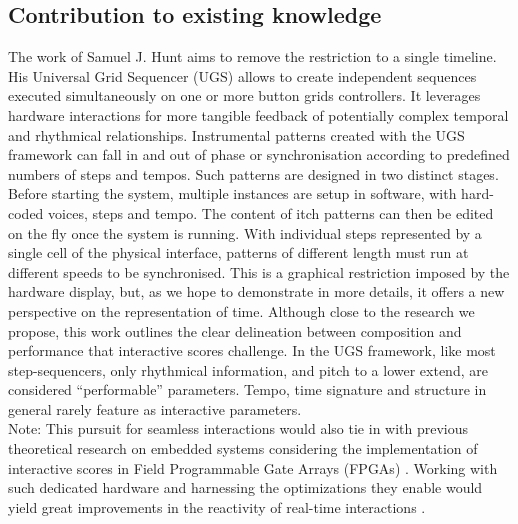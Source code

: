 \documentclass[journal,onecolumn]{IEEEtran}
\begin{document}
\subsection{Contribution to existing knowledge}
The work of Samuel J. Hunt \cite{hunt:poly} aims to remove the restriction to a single timeline. His Universal Grid Sequencer (UGS) allows to create independent sequences executed simultaneously on one or more button grids controllers. It leverages hardware interactions for more tangible feedback of potentially complex temporal and rhythmical relationships. Instrumental patterns created with the UGS framework can fall in and out of phase or synchronisation according to predefined numbers of steps and tempos. Such patterns are designed in two distinct stages. Before starting the system, multiple instances are setup in software, with hard-coded voices, steps and tempo. The content of itch patterns can then be edited on the fly once the system is running. With individual steps represented by a single cell of the physical interface, patterns of different length must run at different speeds to be synchronised. This is a graphical restriction imposed by the hardware display, but, as we hope to demonstrate in more details, it offers a new perspective on the representation of time. Although close to the research we propose, this work outlines the clear delineation between composition and performance that interactive scores challenge. In the UGS framework, like most step-sequencers, only rhythmical information, and pitch to a lower extend, are considered ``performable'' parameters. Tempo, time signature and structure in general rarely feature as interactive parameters. 
\\

Note: This pursuit for seamless interactions would also tie in with previous theoretical research on embedded systems considering the implementation of interactive scores in Field Programmable Gate Arrays (FPGAs) \cite{arias:fpga}. Working with such dedicated hardware and harnessing the optimizations they enable would yield great improvements in the reactivity of real-time interactions \cite{popoff:fpga}. 

\end{document}
